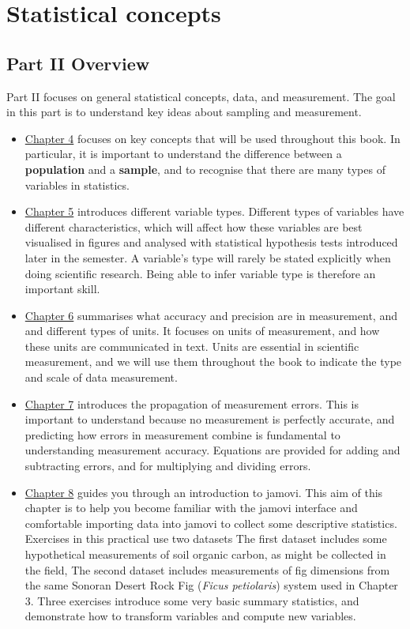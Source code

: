 \documentclass[
  openany]{scrbook}
\begin{document}
\hypertarget{part-statistical-concepts}{%
\part{Statistical concepts}\label{part-statistical-concepts}}

\hypertarget{Week2}{%
\chapter*{Part II Overview}\label{Week2}}

Part II focuses on general statistical concepts, data, and measurement.
The goal in this part is to understand key ideas about sampling and measurement.

\begin{itemize}
\item
  \protect\hyperlink{Chapter_4}{Chapter 4} focuses on key concepts that will be used throughout this book.
  In particular, it is important to understand the difference between a \textbf{population} and a \textbf{sample}, and to recognise that there are many types of variables in statistics.
\item
  \protect\hyperlink{Chapter_5}{Chapter 5} introduces different variable types.
  Different types of variables have different characteristics, which will affect how these variables are best visualised in figures and analysed with statistical hypothesis tests introduced later in the semester.
  A variable's type will rarely be stated explicitly when doing scientific research.
  Being able to infer variable type is therefore an important skill.
\item
  \protect\hyperlink{Chapter_6}{Chapter 6} summarises what accuracy and precision are in measurement, and and different types of units.
  It focuses on units of measurement, and how these units are communicated in text.
  Units are essential in scientific measurement, and we will use them throughout the book to indicate the type and scale of data measurement.
\item
  \protect\hyperlink{Chapter_7}{Chapter 7} introduces the propagation of measurement errors.
  This is important to understand because no measurement is perfectly accurate, and predicting how errors in measurement combine is fundamental to understanding measurement accuracy.
  Equations are provided for adding and subtracting errors, and for multiplying and dividing errors.
\item
  \protect\hyperlink{Chapter_8}{Chapter 8} guides you through an introduction to jamovi.
  This aim of this chapter is to help you become familiar with the jamovi interface and comfortable importing data into jamovi to collect some descriptive statistics.
  Exercises in this practical use two datasets
  The first dataset includes some hypothetical measurements of soil organic carbon, as might be collected in the field,
  The second dataset includes measurements of fig dimensions from the same Sonoran Desert Rock Fig (\emph{Ficus petiolaris}) system used in Chapter 3.
  Three exercises introduce some very basic summary statistics, and demonstrate how to transform variables and compute new variables.
\end{itemize}
\end{document}
